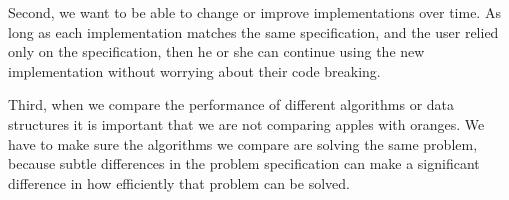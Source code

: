 Second, we want to be able to change or improve implementations over
time.  As long as each implementation matches the same specification,
and the user relied only on the specification, then he or she can
continue using the new implementation without worrying about their
code breaking. 
%

Third, when we compare the performance of different
algorithms or data structures it is important that we are not
comparing apples with oranges.  We have to make sure the algorithms we
compare are solving the same problem, because subtle differences in
the problem specification can make a significant difference in how
efficiently that problem can be solved.
